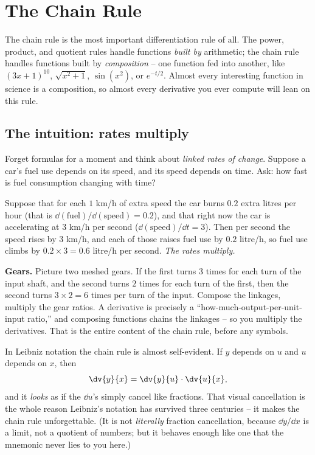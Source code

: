 \section{The Chain Rule}
\label{ch11:chain-rule}

The chain rule is the most important differentiation rule of all. The power, product, and
quotient rules handle functions \emph{built by} arithmetic; the chain rule handles
functions built by \emph{composition} -- one function fed into another, like
$(3x+1)^{10}$, $\sqrt{x^2+1}$, $\sin(x^2)$, or $e^{-t/2}$. Almost every interesting
function in science is a composition, so almost every derivative you ever compute will
lean on this rule.

\subsection{The intuition: rates multiply}

Forget formulas for a moment and think about \emph{linked rates of change}. Suppose a
car's fuel use depends on its speed, and its speed depends on time. Ask: how fast is fuel
consumption changing with time?

Suppose that for each $1$ km/h of extra speed the car burns $0.2$
extra litres per hour (that is $\dd(\text{fuel})/\dd(\text{speed}) = 0.2$), and that right
now the car is accelerating at $3$ km/h per second
($\dd(\text{speed})/\dd t = 3$). Then per second the speed rises by $3$ km/h, and each of
those raises fuel use by $0.2$ litre/h, so fuel use climbs by $0.2 \times 3 = 0.6$ litre/h
per second. \emph{The rates multiply.}

\begin{intuitionbox}
\textbf{Gears.} Picture two meshed gears. If the first turns $3$ times for each turn of
the input shaft, and the second turns $2$ times for each turn of the first, then the
second turns $3\times 2 = 6$ times per turn of the input. Compose the linkages, multiply
the gear ratios. A derivative is precisely a ``how-much-output-per-unit-input ratio,''
and composing functions chains the linkages -- so you multiply the derivatives. That is
the entire content of the chain rule, before any symbols.
\end{intuitionbox}

In Leibniz notation the chain rule is almost self-evident. If $y$ depends on $u$ and $u$
depends on $x$, then
\[
  \dv{y}{x} = \dv{y}{u}\cdot\dv{u}{x},
\]
and it \emph{looks} as if the $\dd u$'s simply cancel like fractions. That visual
cancellation is the whole reason Leibniz's notation has survived three centuries -- it
makes the chain rule unforgettable. (It is not \emph{literally} fraction cancellation,
because $\dd y/\dd x$ is a limit, not a quotient of numbers; but it behaves enough like
one that the mnemonic never lies to you here.)

